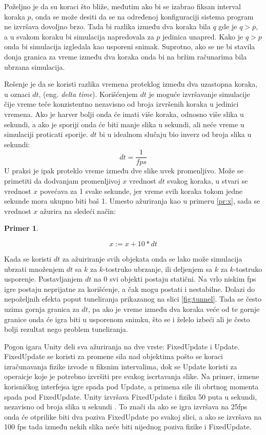 \documentclass[12pt,oneside]{memoir}
\newtheorem{primer}{Primer}[section]
\begin{document}
Poželjno je da su koraci što bliže, međutim ako bi se izabrao fiksan interval koraka $p$, onda se može desiti
da se na određenoj konfiguraciji sistema program ne izvršava dovoljno brzo. 
Tada bi razlika između dva koraka bila $q$ gde je $q > p$, a u svakom koraku bi simulacija napredovala za 
$p$ jedinica unapred. Kako je $q > p$ onda bi simulacija izgledala kao usporeni snimak.
Suprotno, ako se ne bi stavila donja granica za vreme između dva koraka onda bi na bržim računarima 
bila ubrzana simulacija.

Rešenje je da se koristi razlika vremena proteklog između dva uzastopna koraka, u oznaci $dt$, (eng. {\em delta time}).
Korišćenjem $dt$ je moguće izvršavanje simulacije čije vreme teče konzistentno nezavisno od broja izvršenih koraka u 
jedinici vremena. Ako je harver bolji onda će imati više koraka, odnosno više slika u sekundi, a ako je 
sporiji onda će biti manje slika u sekundi, ali neće vreme u simulaciji proticati sporije.
$dt$ bi u idealnom slučaju bio inverz od broja slika u sekundi:
$$dt = \frac{1}{fps}$$
U praksi je ipak proteklo vreme između dve slike uvek promenljivo.
Može se primetiti da dodvanjam promenljivoj $x$ vrednost $dt$ svakog koraka, u stvari se vrednost $x$ povećava 
za 1 svake sekunde, jer vreme svih koraka tokom jedne sekunde mora ukupno biti baš 1.
Umesto ažuriranja kao u primeru \ref{pr:x}, sada se vrednost $x$ ažurira na sledeći način:
\begin{primer}
	\label{pr:x2}
	
	$$ x:= x + 10 * dt $$
\end{primer}

Kada se koristi $dt$ za ažuiriranje svih objekata onda se lako može simulacija ubrzati množenjem $dt$ 
sa $k$ za $k$-tostruko ubrzanje, ili deljenjem sa $k$ za $k$-tostruko usporenje. Postavljanjem $dt$ na 0 svi 
objekti postaju statični. 
Na vrlo niskim fps igre postaju neprijatne za korišćenje, a čak mogu postati i nestabilne. Dolazi do nepoželjnih efekta 
poput tuneliranja prikazanog na slici \ref{fig:tunnel}. Tada se često uzima gornja granica za $dt$, pa 
ako je vreme između dva koraka veće od te gornje granice onda će igra biti u usporenom snimku, što se i želelo izbeći 
ali je često bolji rezultat nego problem tuneliranja.

Pogon igara Unity deli sva ažuriranja na dve vrste: FixedUpdate i Update. 
FixedUpdate se koristi za promene sila nad objektima pošto se koraci izračunavanja fizike izvode u fiksnim intervalima, 
dok se Update koristi za operaicje koje je potrebno izvršiti pre svakog iscrtavanja slike. 
Na primer, izmene korisničkog interfejsa igre spada pod Update, a primena sile ili obrtnog momenta spada pod FixedUpdate.
Unity izvršava FixedUpdate i fiziku 50 puta u sekundi, nezavisno od broja slika u sekundi \cite{unity}.
To znači da ako se igra izvršava na 25fps onda će otprilike biti dva poziva FixedUpdate po svakoj slici,
a ako se izvršava na 100 fps tada između nekih slika neće biti nijednog poziva fizike i FixedUpdate.
\end{document}

